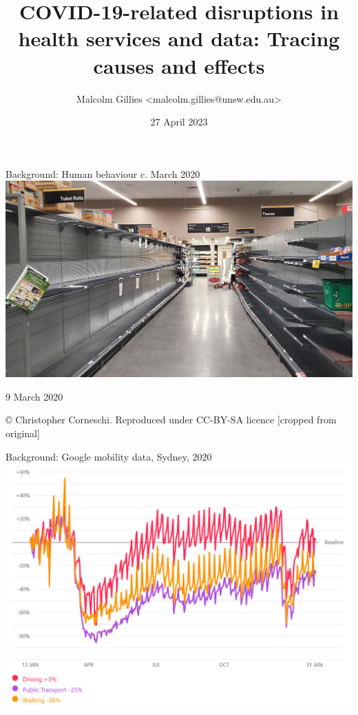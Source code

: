 \documentclass[aspectratio=169,12pt]{beamer} %
\title{COVID-19-related disruptions in health services and data: Tracing causes and effects}
\author{Malcolm Gillies <malcolm.gillies@unsw.edu.au>}
\date{27 April 2023}
\begin{document}
{
\begin{frame}
\titlepage
\end{frame}
}

\begin{frame}{Background: Human behaviour c. March 2020}
\centering
\includegraphics[height=0.75\textheight]
	{ref/toilet-paper-crop.jpg}

	\tiny 9 March 2020

	\copyright\: Christopher Corneschi.
	Reproduced under CC-BY-SA licence [cropped from original]
\end{frame}

\begin{frame}{Background: Google mobility data, Sydney, 2020}
\centering
\includegraphics[height=0.8\textheight]
        {ref/google-mobility-20210202.PNG}
\end{frame}
\end{document}
